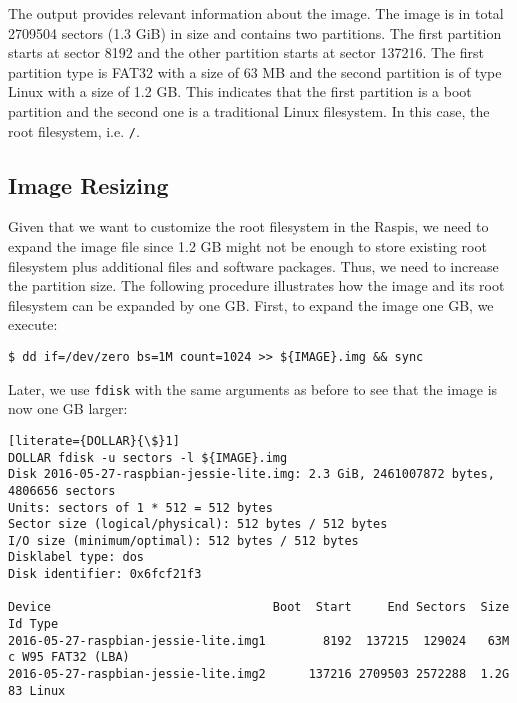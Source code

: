 The output provides relevant information about the image. The image is in
total 2709504 sectors (1.3 GiB) in size and contains two partitions. The
first partition starts at sector 8192 and the other partition starts at
sector 137216. The first partition type is FAT32 with a size of 63 MB
and the second partition is of type Linux with a size of 1.2 GB. This
indicates that the first partition is a boot partition and the second
one is a traditional Linux filesystem. In this case, the root filesystem, i.e. \texttt{/}.

\subsection{Image Resizing}
Given that we want to customize the root filesystem in the \ac{Raspi}s,
we need to expand the image file since 1.2 GB might not be enough to store
existing root filesystem plus additional files and software packages.
Thus,
we need to increase the partition size. The following procedure illustrates
how the image and its root filesystem can be expanded by one GB.
First, to expand the image one GB, we execute:

\begin{lstlisting}[]
$ dd if=/dev/zero bs=1M count=1024 >> ${IMAGE}.img && sync
\end{lstlisting}
\FloatBarrier
\vspace{-5mm}

Later, we use \texttt{fdisk} with the same arguments as before to see that
the image is now one GB larger:
\begin{lstlisting}[literate={DOLLAR}{\$}1]
DOLLAR fdisk -u sectors -l ${IMAGE}.img
Disk 2016-05-27-raspbian-jessie-lite.img: 2.3 GiB, 2461007872 bytes, 4806656 sectors
Units: sectors of 1 * 512 = 512 bytes
Sector size (logical/physical): 512 bytes / 512 bytes
I/O size (minimum/optimal): 512 bytes / 512 bytes
Disklabel type: dos
Disk identifier: 0x6fcf21f3

Device                               Boot  Start     End Sectors  Size Id Type
2016-05-27-raspbian-jessie-lite.img1        8192  137215  129024   63M  c W95 FAT32 (LBA)
2016-05-27-raspbian-jessie-lite.img2      137216 2709503 2572288  1.2G 83 Linux
\end{lstlisting}
\FloatBarrier
\vspace{-5mm}

